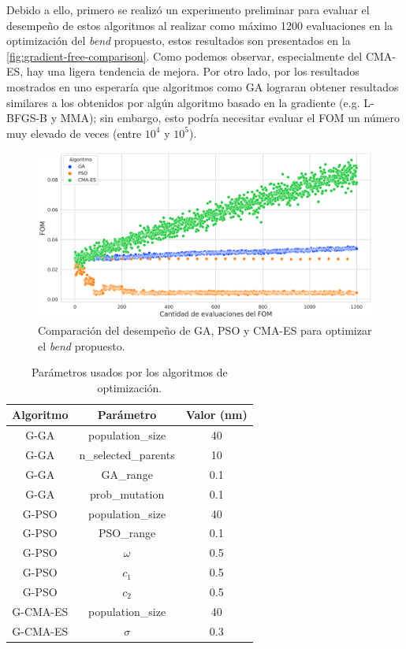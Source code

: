 Debido a ello, primero se realizó un experimento preliminar para evaluar el desempeño de estos
algoritmos al realizar como máximo 1200 evaluaciones en la optimización del \emph{bend} propuesto, 
estos resultados son presentados en la \autoref{fig:gradient-free-comparison}.
Como podemos observar, especialmente del CMA-ES, hay una ligera tendencia de mejora.
Por otro lado, por los resultados mostrados en \cite{Christiansen2021matlab} uno esperaría que algoritmos como GA lograran 
obtener resultados similares a los obtenidos por algún algoritmo basado en la gradiente (e.g. L-BFGS-B y MMA); 
sin embargo, esto podría necesitar evaluar el FOM un número muy elevado de veces (entre $10^4$ y $10^5$).

\begin{figure}[ht]
  \centering
  \includegraphics[width=1.0\textwidth]{image/proposal/bend-opt-cont.png}
  \caption{Comparación del desempeño de GA, PSO y CMA-ES para optimizar el \emph{bend} propuesto.}
  \label{fig:gradient-free-comparison}
\end{figure}

\begin{table}[ht]
    \centering
    \begin{tabular}{|c|c|c|}
    \hline 
    Algoritmo & Parámetro &  Valor (nm) \\
    \hline
    G-GA & population\_size & 40 \\
    G-GA & n\_selected\_parents & 10 \\
    G-GA & GA\_range & 0.1 \\
    G-GA & prob\_mutation & 0.1 \\
    G-PSO & population\_size & 40 \\
    G-PSO & PSO\_range & 0.1 \\
    G-PSO & $\omega$ & 0.5 \\
    G-PSO & $c_1$ & 0.5 \\
    G-PSO & $c_2$ & 0.5 \\
    G-CMA-ES & population\_size & 40 \\
    G-CMA-ES & $\sigma$ & 0.3 \\
    \hline 
    \end{tabular}
    \caption{Parámetros usados por los algoritmos de optimización.}
    \label{tab:alg-parameters}
\end{table}

